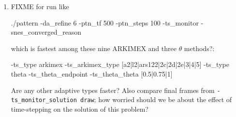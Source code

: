 \begin{enumerate}
\item FIXME for run like
\begin{cline}
./pattern -da_refine 6 -ptn_tf 500 -ptn_steps 100 -ts_monitor -snes_converged_reason
\end{cline}
which is fastest among these nine ARKIMEX and three $\theta$ methods?:
\begin{code}
-ts_type arkimex -ts_arkimex_type [a2|l2|ars122|2c|2d|2e|3|4|5]
-ts_type theta -ts_theta_endpoint -ts_theta_theta [0.5|0.75|1]
\end{code}
Are any other adaptive \pTS types faster?  Also compare final frames from \texttt{-ts\_monitor\_solution draw}; how worried should we be about the effect of time-stepping on the solution of this problem?
\end{enumerate}
